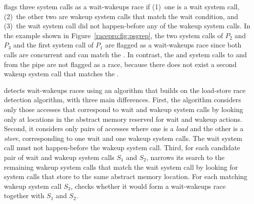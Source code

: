 \racepro flags three system calls as a wait-wakeups race if (1)~one is a
wait system call, (2)~the other two are wakeup system calls that match
the wait condition, and (3)~the wait system call did not happen-before
any of the wakeup system calls.
In the  example shown in Figure~\ref{racepro:fig:psgrep},
the two  system calls of $P_2$ and $P_3$ and the first
 system call of $P_1$ are flagged as a wait-wakeups race since
both  calls are concurrent and can match the .  In
contrast, the  and  system calls to and from the pipe
are not flagged as a race, because there does not exist a second
wakeup system call that matches the . 

\racepro detects wait-wakeups races using an algorithm that builds on the
load-store race detection algorithm, with three main differences. First,
the algorithm considers only those accesses that correspond to wait and
wakeup system calls by looking only at locations in the abstract
memory reserved for wait and wakeup actions.  Second, it considers
only pairs of accesses where one is a \emph{load} and the other is a
\emph{store},
corresponding to one wait and one wakeup system calls. The wait system
call must not happen-before the wakeup system call. Third, for each
candidate pair of wait and wakeup system calls $S_1$ and $S_2$, \racepro
narrows its search to the remaining wakeup system calls that match the
wait system call by looking for system calls that store to the same
abstract memory location.  For each matching wakeup system call $S_3$,
\racepro checks whether it would form a wait-wakeups race together with
$S_1$ and $S_2$. 

